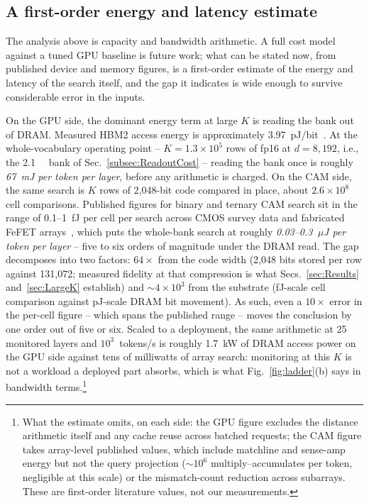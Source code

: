 \documentclass[conference]{IEEEtran}
\newcommand{\cam}{{CAM}\xspace}
\newcommand{\fefet}{{FeFET}\xspace}
\begin{document}
\subsection{A first-order energy and latency estimate}
\label{subsec:CostModelGap}
The analysis above is capacity and bandwidth arithmetic. A full cost
model against a tuned GPU baseline is future work; what can be stated
now, from
published device and memory figures, is a first-order estimate of the
energy and latency of the search itself, and the gap it indicates is
wide enough to survive considerable error in the inputs.

On the GPU side, the dominant energy term at large $K$ is reading the
bank out of DRAM. Measured HBM2 access energy is approximately
3.97~pJ/bit~\cite{oconnor2017fgdram}. At the whole-vocabulary
operating point -- $K=1.3\!\times\!10^{5}$ rows of fp16 at $d=8{,}192$,
i.e., the \qty{2.1}{\giga\byte} bank of
Sec.~\ref{subsec:ReadoutCost} -- reading the bank once is roughly
\emph{67~mJ per token per layer}, before any arithmetic is charged. On
the \cam side, the same search is $K$ rows of 2{,}048-bit code compared
in place, about $2.6\!\times\!10^{8}$ cell comparisons. Published
figures for binary and ternary \cam search sit in the range of
0.1--1~fJ per cell per search across CMOS survey data and fabricated
\fefet arrays~\cite{pagiamtzis2006cam,ni2019fetcam,liu2022evacam},
which puts the whole-bank search at roughly \emph{0.03--0.3~$\mu$J per
token per layer} -- five to six orders of magnitude under the DRAM
read. The gap decomposes into two factors: $64\times$ from the code
width (2{,}048 bits stored per row against 131{,}072; measured
fidelity at that compression is what Secs.~\ref{sec:Results}
and~\ref{sec:LargeK} establish) and $\sim$$4\!\times\!10^{3}$ from the
substrate (fJ-scale cell comparison against pJ-scale DRAM bit
movement). As such, even a $10\times$ error in the per-cell figure --
which spans the published range -- moves the conclusion by one order
out of five or six. Scaled to a deployment, the same arithmetic at 25
monitored layers and $10^{3}$~tokens/s is roughly 1.7~kW of DRAM
access power on the GPU side against tens of milliwatts of array
search: monitoring at this $K$ is not a workload a deployed part
absorbs, which is what Fig.~\ref{fig:ladder}(b) says in bandwidth
terms.\footnote{What the estimate omits, on each side: the GPU figure
excludes the distance arithmetic itself and any cache reuse across
batched requests; the \cam figure
takes array-level published values, which include matchline and
sense-amp energy but not the query projection ($\sim$$10^{6}$
multiply--accumulates per token, negligible at this scale) or the
mismatch-count reduction across subarrays. These are first-order
literature values, not our measurements.}
\end{document}
